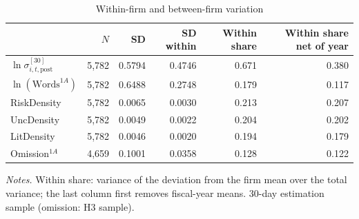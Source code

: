 \begin{table}[htbp]
\centering
\caption{Within-firm and between-firm variation}
\label{tab:variance}
\small
\begin{tabular}{lrrrrr}
\toprule
 & $N$ & SD & SD within & Within share & Within share net of year \\
\midrule
$\ln\sigma^{[30]}_{i,t,\mathrm{post}}$ & 5,782 & 0.5794 & 0.4746 & 0.671 & 0.380 \\
$\ln(\text{Words}^{1A})$ & 5,782 & 0.6488 & 0.2748 & 0.179 & 0.117 \\
RiskDensity & 5,782 & 0.0065 & 0.0030 & 0.213 & 0.207 \\
UncDensity & 5,782 & 0.0049 & 0.0022 & 0.204 & 0.202 \\
LitDensity & 5,782 & 0.0046 & 0.0020 & 0.194 & 0.179 \\
Omission$^{1A}$ & 4,659 & 0.1001 & 0.0358 & 0.128 & 0.122 \\
\bottomrule
\end{tabular}
\par\smallskip
\begin{minipage}{\linewidth}\footnotesize
\emph{Notes.} Within share: variance of the deviation from the firm mean over the total variance; the last column first removes fiscal-year means. 30-day estimation sample (omission: H3 sample).
\end{minipage}
\end{table}
